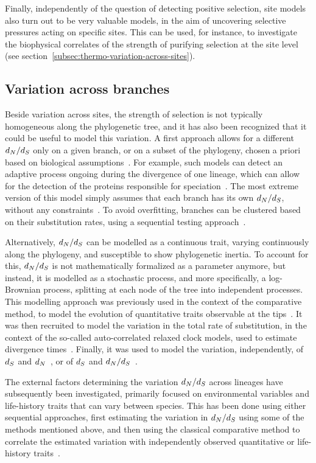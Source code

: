 Finally, independently of the question of detecting positive selection, site models also turn out to be very valuable models, in the aim of uncovering selective pressures acting on specific sites.
This can be used, for instance, to investigate the biophysical correlates of the strength of purifying selection at the site level (see section~\ref{subsec:thermo-variation-across-sites}).

\subsection{Variation across branches}
\label{subsec:variation-across-branches}

Beside variation across sites, the strength of selection is not typically homogeneous along the phylogenetic tree, and it has also been recognized that it could be useful to model this variation.
A first approach allows for a different $d_N / d_S$ only on a given branch, or on a subset of the phylogeny, chosen a priori based on biological assumptions~\citep{Yang1998}.
For example, such models can detect an adaptive process ongoing during the divergence of one lineage, which can allow for the detection of the proteins responsible for speciation~\citep{Yang1998, Zhang2004}.
The most extreme version of this model simply assumes that each branch has its own $d_N / d_S$, without any constraints~\citep{Popadin2007}.
To avoid overfitting, branches can be clustered based on their substitution rates, using a sequential testing approach~\citep{Dutheil2012}.

Alternatively, $d_N / d_S$ can be modelled as a continuous trait, varying continuously along the phylogeny, and susceptible to show phylogenetic inertia.
To account for this, $d_N / d_S$ is not mathematically formalized as a parameter anymore, but instead, it is modelled as a stochastic process, and more specifically, a log-Brownian process, splitting at each node of the tree into independent processes.
This modelling approach was previously used in the context of the comparative method, to model the evolution of quantitative traits observable at the tips~\citep{Felsenstein1985, Huelsenbeck2003}.
It was then recruited to model the variation in the total rate of substitution, in the context of the so-called auto-correlated relaxed clock models, used to estimate divergence times~\citep{Thorne1998}.
Finally, it was used to model the variation, independently, of $d_S$ and $d_N$~\citep{Seo2004}, or of $d_S$ and $d_N / d_S$~\citep{Lartillot2011}.

The external factors determining the variation $d_N / d_S$ across lineages have subsequently been investigated, primarily focused on environmental variables and life-history traits that can vary between species.
This has been done using either sequential approaches, first estimating the variation in $d_N / d_S$ using some of the methods mentioned above, and then using the classical comparative method to correlate the estimated variation with independently observed quantitative or life-history traits~\citep{Popadin2007, Lanfear2010, Romiguier2014}.

